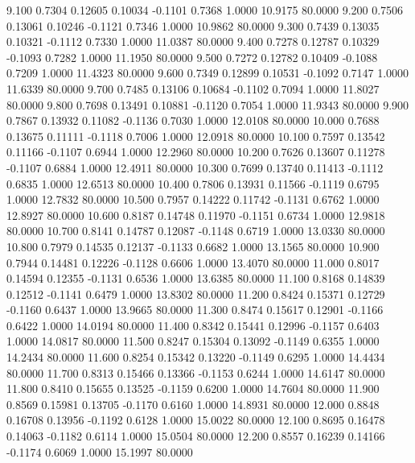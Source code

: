    9.100   0.7304   0.12605   0.10034  -0.1101   0.7368   1.0000  10.9175  80.0000
   9.200   0.7506   0.13061   0.10246  -0.1121   0.7346   1.0000  10.9862  80.0000
   9.300   0.7439   0.13035   0.10321  -0.1112   0.7330   1.0000  11.0387  80.0000
   9.400   0.7278   0.12787   0.10329  -0.1093   0.7282   1.0000  11.1950  80.0000
   9.500   0.7272   0.12782   0.10409  -0.1088   0.7209   1.0000  11.4323  80.0000
   9.600   0.7349   0.12899   0.10531  -0.1092   0.7147   1.0000  11.6339  80.0000
   9.700   0.7485   0.13106   0.10684  -0.1102   0.7094   1.0000  11.8027  80.0000
   9.800   0.7698   0.13491   0.10881  -0.1120   0.7054   1.0000  11.9343  80.0000
   9.900   0.7867   0.13932   0.11082  -0.1136   0.7030   1.0000  12.0108  80.0000
  10.000   0.7688   0.13675   0.11111  -0.1118   0.7006   1.0000  12.0918  80.0000
  10.100   0.7597   0.13542   0.11166  -0.1107   0.6944   1.0000  12.2960  80.0000
  10.200   0.7626   0.13607   0.11278  -0.1107   0.6884   1.0000  12.4911  80.0000
  10.300   0.7699   0.13740   0.11413  -0.1112   0.6835   1.0000  12.6513  80.0000
  10.400   0.7806   0.13931   0.11566  -0.1119   0.6795   1.0000  12.7832  80.0000
  10.500   0.7957   0.14222   0.11742  -0.1131   0.6762   1.0000  12.8927  80.0000
  10.600   0.8187   0.14748   0.11970  -0.1151   0.6734   1.0000  12.9818  80.0000
  10.700   0.8141   0.14787   0.12087  -0.1148   0.6719   1.0000  13.0330  80.0000
  10.800   0.7979   0.14535   0.12137  -0.1133   0.6682   1.0000  13.1565  80.0000
  10.900   0.7944   0.14481   0.12226  -0.1128   0.6606   1.0000  13.4070  80.0000
  11.000   0.8017   0.14594   0.12355  -0.1131   0.6536   1.0000  13.6385  80.0000
  11.100   0.8168   0.14839   0.12512  -0.1141   0.6479   1.0000  13.8302  80.0000
  11.200   0.8424   0.15371   0.12729  -0.1160   0.6437   1.0000  13.9665  80.0000
  11.300   0.8474   0.15617   0.12901  -0.1166   0.6422   1.0000  14.0194  80.0000
  11.400   0.8342   0.15441   0.12996  -0.1157   0.6403   1.0000  14.0817  80.0000
  11.500   0.8247   0.15304   0.13092  -0.1149   0.6355   1.0000  14.2434  80.0000
  11.600   0.8254   0.15342   0.13220  -0.1149   0.6295   1.0000  14.4434  80.0000
  11.700   0.8313   0.15466   0.13366  -0.1153   0.6244   1.0000  14.6147  80.0000
  11.800   0.8410   0.15655   0.13525  -0.1159   0.6200   1.0000  14.7604  80.0000
  11.900   0.8569   0.15981   0.13705  -0.1170   0.6160   1.0000  14.8931  80.0000
  12.000   0.8848   0.16708   0.13956  -0.1192   0.6128   1.0000  15.0022  80.0000
  12.100   0.8695   0.16478   0.14063  -0.1182   0.6114   1.0000  15.0504  80.0000
  12.200   0.8557   0.16239   0.14166  -0.1174   0.6069   1.0000  15.1997  80.0000
